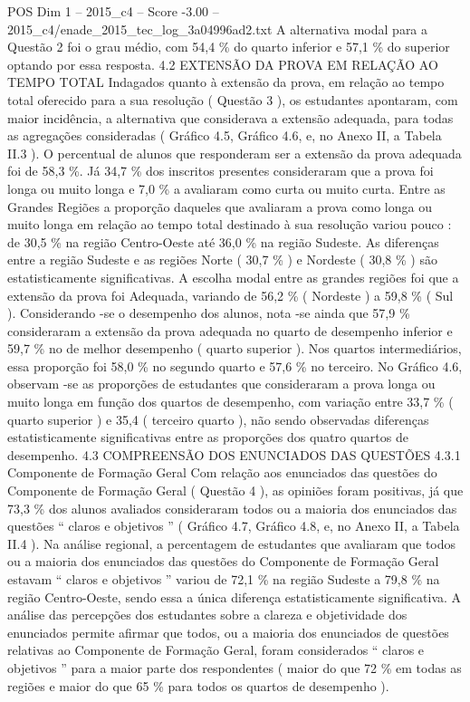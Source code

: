 \begin{textsample}{POS Dim 1 – 2015\_c4 – Score -3.00 – 2015\_c4/enade\_2015\_tec\_log\_3a04996ad2.txt}
A alternativa modal para a Questão 2 foi o grau médio, com 54,4 \% do quarto inferior e 57,1 \% do superior optando por essa resposta. 4.2 EXTENSÃO DA PROVA EM RELAÇÃO AO TEMPO TOTAL Indagados quanto à extensão da prova, em relação ao tempo total oferecido para a sua resolução ( Questão 3 ), os estudantes apontaram, com maior incidência, a alternativa que considerava a extensão adequada, para todas as agregações consideradas ( Gráfico 4.5, Gráfico 4.6, e, no Anexo II, a Tabela II.3 ).
O percentual de alunos que responderam ser a extensão da prova adequada foi de 58,3 \%.
Já 34,7 \% dos inscritos presentes consideraram que a prova foi longa ou muito longa e 7,0 \% a avaliaram como curta ou muito curta.
Entre as Grandes Regiões a proporção daqueles que avaliaram a prova como longa ou muito longa em relação ao tempo total destinado à sua resolução variou pouco : de 30,5 \% na região Centro-Oeste até 36,0 \% na região Sudeste.
As diferenças entre a região Sudeste e as regiões Norte ( 30,7 \% ) e Nordeste ( 30,8 \% ) são estatisticamente significativas.
A escolha modal entre as grandes regiões foi que a extensão da prova foi Adequada, variando de 56,2 \% ( Nordeste ) a 59,8 \% ( Sul ).
Considerando -se o desempenho dos alunos, nota -se ainda que 57,9 \% consideraram a extensão da prova adequada no quarto de desempenho inferior e 59,7 \% no de melhor desempenho ( quarto superior ).
Nos quartos intermediários, essa proporção foi 58,0 \% no segundo quarto e 57,6 \% no terceiro.
No Gráfico 4.6, observam -se as proporções de estudantes que consideraram a prova longa ou muito longa em função dos quartos de desempenho, com variação entre 33,7 \% ( quarto superior ) e 35,4 ( terceiro quarto ), não sendo observadas diferenças estatisticamente significativas entre as proporções dos quatro quartos de desempenho. 4.3 COMPREENSÃO DOS ENUNCIADOS DAS QUESTÕES 4.3.1 Componente de Formação Geral Com relação aos enunciados das questões do Componente de Formação Geral ( Questão 4 ), as opiniões foram positivas, já que 73,3 \% dos alunos avaliados consideraram todos ou a maioria dos enunciados das questões “ claros e objetivos ” ( Gráfico 4.7, Gráfico 4.8, e, no Anexo II, a Tabela II.4 ).
Na análise regional, a percentagem de estudantes que avaliaram que todos ou a maioria dos enunciados das questões do Componente de Formação Geral estavam “ claros e objetivos ” variou de 72,1 \% na região Sudeste a 79,8 \% na região Centro-Oeste, sendo essa a única diferença estatisticamente significativa.
A análise das percepções dos estudantes sobre a clareza e objetividade dos enunciados permite afirmar que todos, ou a maioria dos enunciados de questões relativas ao Componente de Formação Geral, foram considerados “ claros e objetivos ” para a maior parte dos respondentes ( maior do que 72 \% em todas as regiões e maior do que 65 \% para todos os quartos de desempenho ).

\end{textsample}
